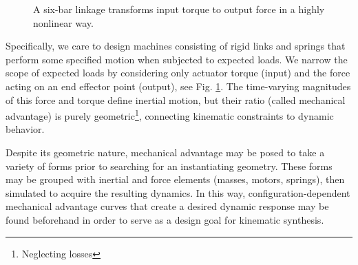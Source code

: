 \documentclass[journal]{IEEEtran}
\begin{document}
\begin{figure}[!t]
	\centering
	\hfil
	\caption{A six-bar linkage transforms input torque to output force in a highly nonlinear way.}
	\label{intro_sixbar}
\end{figure}

Specifically, we care to design machines consisting of rigid links and springs that perform some specified motion when subjected to expected loads.
We narrow the scope of expected loads by considering only actuator torque (input) and the force acting on an end effector point (output), see Fig. \ref{intro_sixbar}.
The time-varying magnitudes of this force and torque define inertial motion, but their ratio (called mechanical advantage) is purely geometric\footnote{Neglecting losses}, connecting kinematic constraints to dynamic behavior.

Despite its geometric nature, mechanical advantage may be posed to take a variety of forms prior to searching for an instantiating geometry.
These forms may be grouped with inertial and force elements (masses, motors, springs), then simulated to acquire the resulting dynamics.
In this way, configuration-dependent mechanical advantage curves that create a desired dynamic response may be found beforehand in order to serve as a design goal for kinematic synthesis.
\end{document}
